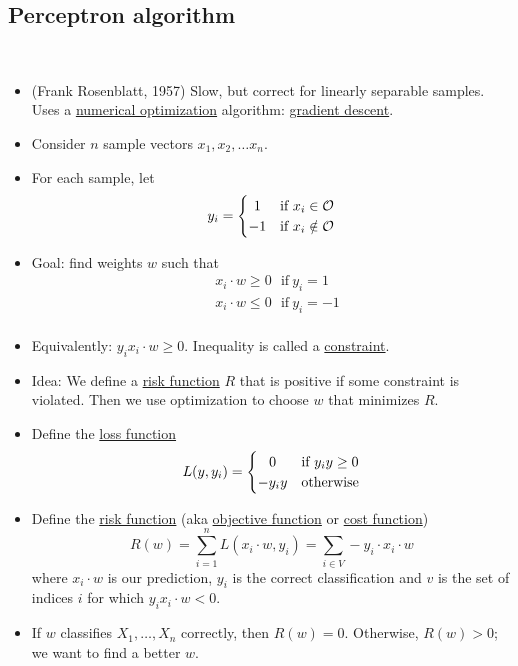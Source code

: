 \documentclass[10pt]{article}
\begin{document}
	\subsection*{Perceptron algorithm}
		\
		\begin{itemize}
			\item (Frank Rosenblatt, 1957) Slow, but correct for linearly separable samples. Uses a \underline{numerical optimization} algorithm: \underline{gradient descent}.
			
			\item Consider $n$ sample vectors $x_{1}, x_{2}, \dots x_{n}$.
			
			\item For each sample, let
				\[
 					y_{i} = \left\{\def\arraystretch{1.2}%
 						\begin{array}{@{}c@{\quad}l@{}}
    						1 & \text{if $x_{i} \in \mathcal{O}$}\\
    						-1 & \text{if $x_{i} \notin \mathcal{O}$}\\
  						\end{array}\right.
				\]
			
			\item Goal: find weights $w$ such that
				\begin{align*}
					& x_{i} \cdot w \geq 0 \ \ \ \text{if} \ y_{i} = 1 \\
					& x_{i} \cdot w \leq 0 \ \ \ \text{if} \ y_{i} = -1\\
				\end{align*}
			 
			 \item Equivalently: $y_{i}x_{i} \cdot w \geq 0$. Inequality is called a \underline{constraint}.
			 
			 \item Idea: We define a \underline{risk function} $R$ that is positive if some constraint is violated. Then we use optimization to choose $w$ that minimizes $R$.
			 
			 \item Define the \underline{loss function}
			 	\[
 					L(y, y_{i}) = \left\{\def\arraystretch{1.2}%
 						\begin{array}{@{}c@{\quad}l@{}}
    						0 & \text{if $y_{i}y \geq 0 $}\\
    						-y_{i}y & \text{otherwise}\\
  						\end{array}\right.
				\]
			
			\item Define the \underline{risk function} (aka \underline{objective function} or \underline{cost function})
				$$ R(w) = \sum_{i=1}^{n} L(x_{i} \cdot w, y_{i}) = 
					\sum_{i \in V} -y_{i} \cdot x_{i} \cdot w $$
				where $x_{i} \cdot w$ is our prediction, $y_{i}$ is the correct classification and $v$ is the set of indices $i$ for which $y_{i}x_{i} \cdot w < 0$.
			\item If $w$ classifies $X_{1}, \dots, X_{n}$ correctly, then $R(w) = 0$. Otherwise, $R(w) > 0$; we want to find a better $w$.
			

\end{itemize}
\end{document}
